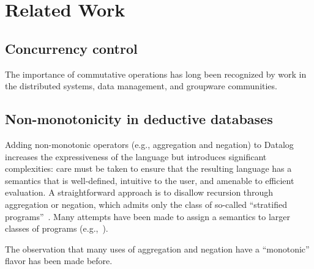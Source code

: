\section{Related Work}

\subsection{Concurrency control}
The importance of commutative operations has long been recognized by work in the
distributed systems, data management, and groupware communities.

\subsection{Non-monotonicity in deductive databases}
Adding non-monotonic operators (e.g., aggregation and negation) to Datalog
increases the expressiveness of the language but introduces significant
complexities: care must be taken to ensure that the resulting language has a
semantics that is well-defined, intuitive to the user, and amenable to efficient
evaluation. A straightforward approach is to disallow recursion through
aggregation or negation, which admits only the class of so-called ``stratified
programs''~\cite{Apt1988}. Many attempts have been made to assign a semantics to
larger classes of programs (e.g.,~\cite{Gelfond1988,Ross1990,VanGelder1991}).

The observation that many uses of aggregation and negation have a ``monotonic''
flavor has been made before.

